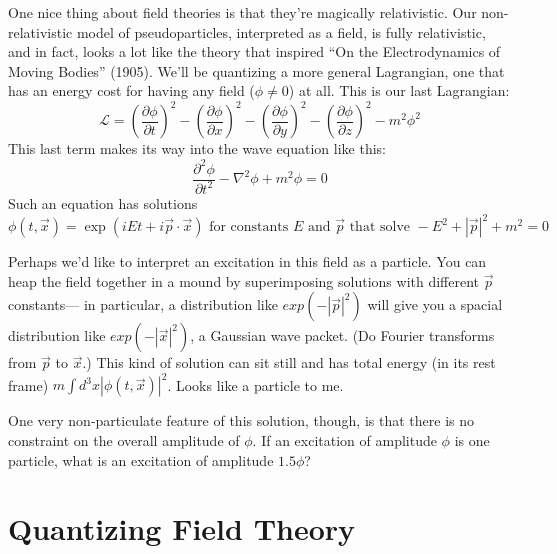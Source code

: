 \documentclass[12pt]{article}
\begin{document}
One nice thing about field theories is that they're magically
relativistic.  Our non-relativistic model of pseudoparticles,
interpreted as a field, is fully relativistic, and in fact, looks a
lot like the theory that inspired ``On the Electrodynamics of Moving
Bodies'' (1905).  We'll be quantizing a more general Lagrangian, one
that has an energy cost for having any field ($\phi \ne 0$) at all.
This is our last Lagrangian:
\begin{equation}
  \mathcal{L} = \left( \frac{\partial \phi}{\partial t} \right)^2 -
  \left( \frac{\partial \phi}{\partial x} \right)^2 - \left(
  \frac{\partial \phi}{\partial y} \right)^2 - \left( \frac{\partial
  \phi}{\partial z} \right)^2 - m^2 \phi^2
\end{equation}
This last term makes its way into the wave equation like this:
\begin{equation}
  \frac{\partial^2 \phi}{\partial t^2} - \nabla^2 \phi + m^2 \phi = 0
\end{equation}
Such an equation has solutions
\begin{equation}
  \phi(t, \vec{x}) = \exp(iEt + i\vec{p}\cdot\vec{x}) \mbox{ for
  constants $E$ and $\vec{p}$ that solve } -E^2 + |\vec{p}|^2 + m^2 = 0
\end{equation}

Perhaps we'd like to interpret an excitation in this field as a
particle.  You can heap the field together in a mound by superimposing
solutions with different $\vec{p}$ constants--- in particular, a
distribution like $exp(-|\vec{p}|^2)$ will give you a spacial
distribution like $exp(-|\vec{x}|^2)$, a Gaussian wave packet.  (Do
Fourier transforms from $\vec{p}$ to $\vec{x}$.)  This kind of
solution can sit still and has total energy (in its rest frame)
$m \int d^3x |\phi(t, \vec{x})|^2$.  Looks like a particle to me.

One very non-particulate feature of this solution, though, is that
there is no constraint on the overall amplitude of $\phi$.  If an
excitation of amplitude $\phi$ is one particle, what is an excitation
of amplitude $1.5 \phi$?

\section{Quantizing Field Theory}
\end{document}
